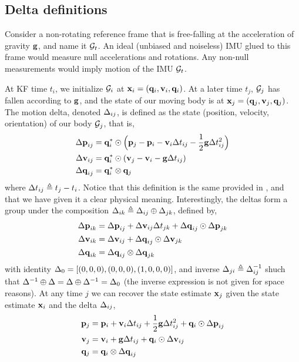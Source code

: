 \subsection{Delta definitions}

Consider a non-rotating reference frame that is free-falling at the acceleration of gravity ${\bf g}$, and name it $\mathcal{G}_t$. 
An ideal (unbiased and noiseless) IMU glued to this frame would measure null accelerations and rotations. 
Any non-null measurements would imply motion of the IMU \wrt  $\mathcal{G}_t$.

At KF time $t_i$, we initialize $\mathcal{G}_i$ at ${\bf x}_i=({\bf q}_i,{\bf v}_i,{\bf q}_i)$.
At a later time $t_j$,  $\mathcal{G}_j$ has fallen according to ${\bf g}$, and the state of our moving body is at ${\bf x}_j=({\bf q}_j,{\bf v}_j,{\bf q}_j)$.
The motion delta, denoted $\Delta_{ij}
$, is defined as the state (position, velocity, orientation) of our body \wrt  $\mathcal{G}_j$, that is,
%
\begin{align}\label{equ:delta_definition}
\begin{split}
{\Delta{\bf p}}_{ij} &= {\bf q}_i^*\odot\Big({\bf p}_j - {\bf p}_i - {\bf v}_i\Delta t_{ij} - \frac12{\bf g}\Delta t_{ij}^2\Big) \\
{\Delta{\bf v}}_{ij} &= {\bf q}_i^*\odot({\bf v}_j - {\bf v}_i - {\bf g}\Delta t_{ij}) \\
{\Delta{\bf q}}_{ij} &= {\bf q}_i^*\otimes{\bf q}_j 
\end{split}
\end{align}
%
where $\Delta t_{ij} \triangleq t_j - t_i$. 
Notice that this definition is the same provided in \cite{LUPTON-09,forster2015imu}, and that we have given it a clear physical meaning.
Interestingly, the deltas form a group under the composition $\Delta_{ik}\triangleq\Delta_{ij}\oplus\Delta_{jk}$, defined by,
%
\begin{align} \label{equ:composition}
\begin{split}
{\Delta{\bf p}}_{ik} 
&= {\Delta{\bf p}}_{ij} + {\Delta{\bf v}}_{ij}\Delta t_{jk} + {\Delta{\bf q}}_{ij}\odot{\Delta{\bf p}}_{jk} \\
{\Delta{\bf v}}_{ik} 
&= {\Delta{\bf v}}_{ij} + {\Delta{\bf q}}_{ij}\odot{\Delta{\bf v}}_{jk} \\
{\Delta{\bf q}}_{ik} 
&= {\Delta{\bf q}}_{ij}\otimes{\Delta{\bf q}}_{jk} 
\end{split}
\end{align}
%
with identity $\Delta_0=[(0,0,0),(0,0,0),(1,0,0,0)]$, and inverse $\Delta_{ji}\triangleq\Delta_{ij}^{-1}$ shuch that $\Delta^{-1}\oplus\Delta=\Delta\oplus\Delta^{-1}=\Delta_0$ (the inverse expression is not given for space reasons).
At any time $j$ we can recover the state estimate ${\bf x}_j$ given the state estimate ${\bf x}_i$ and the delta $\Delta_{ij}$,
%
\begin{align} \label{equ:reconstruction}
\begin{split}
{\bf p}_j &= {\bf p}_i + {\bf v}_i\Delta t_{ij} + \frac12{\bf g}\Delta t_{ij}^2 + {\bf q}_i\odot{\Delta{\bf p}}_{ij} \\
{\bf v}_j &= {\bf v}_i + {\bf g}\Delta t_{ij} + {\bf q}_i\odot{\Delta{\bf v}}_{ij} \\
{\bf q}_j &= {\bf q}_i\otimes{\Delta{\bf q}}_{ij}   
\end{split}
\end{align}

